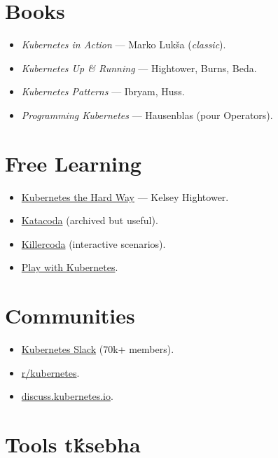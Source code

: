 \documentclass[11pt,a4paper]{book}
\newcommand{\tuni}[1]{\textit{\color{k8sdark}#1}}
\begin{document}
\section{Books}

\begin{itemize}
  \item \textit{Kubernetes in Action} --- Marko Lukša (\tuni{classic}).
  \item \textit{Kubernetes Up \& Running} --- Hightower, Burns, Beda.
  \item \textit{Kubernetes Patterns} --- Ibryam, Huss.
  \item \textit{Programming Kubernetes} --- Hausenblas (pour Operators).
\end{itemize}

\section{Free Learning}

\begin{itemize}
  \item \href{https://github.com/kelseyhightower/kubernetes-the-hard-way}{Kubernetes the Hard Way} --- Kelsey Hightower.
  \item \href{https://www.katacoda.com}{Katacoda} (archived but useful).
  \item \href{https://killercoda.com}{Killercoda} (interactive scenarios).
  \item \href{https://labs.play-with-k8s.com}{Play with Kubernetes}.
\end{itemize}

\section{Communities}

\begin{itemize}
  \item \href{https://slack.k8s.io}{Kubernetes Slack} (70k+ members).
  \item \href{https://www.reddit.com/r/kubernetes}{r/kubernetes}.
  \item \href{https://discuss.kubernetes.io}{discuss.kubernetes.io}.
\end{itemize}

\section{Tools t\'ksebha}
\end{document}
